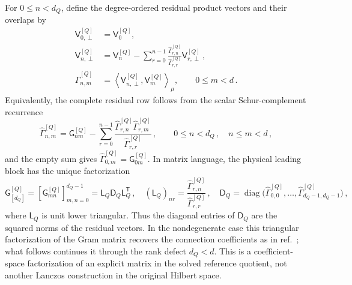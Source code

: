 \documentclass[a4paper,11pt]{article}
\theoremstyle{definition}
\theoremstyle{remark}
\newcommand{\diag}{\operatorname{diag}}
\begin{document}
For $0\le n<d_Q$, define the degree-ordered residual product vectors and
their overlaps by
\begin{equation}
\begin{aligned}
   \mathsf V_{0,\perp}^{[Q]}&=\mathsf V_0^{[Q]},\\
   \mathsf V_{n,\perp}^{[Q]}
   &=\mathsf V_n^{[Q]}
   -\sum_{r=0}^{n-1}
   \frac{\widehat\Gamma_{r,n}^{[Q]}}
        {\widehat\Gamma_{r,r}^{[Q]}}
   \mathsf V_{r,\perp}^{[Q]}\,,\\
   \widehat\Gamma_{n,m}^{[Q]}
   &=\left\langle
      \mathsf V_{n,\perp}^{[Q]},\mathsf V_m^{[Q]}
     \right\rangle_\mu,
   \qquad 0\le m<d\,.
\end{aligned}
   \label{eq:finite-product-residuals-app}
\end{equation}
Equivalently, the complete residual row follows from the scalar
Schur-complement recurrence
\begin{equation}
   \widehat\Gamma_{n,m}^{[Q]}
   =\mathsf G_{nm}^{[Q]}
   -\sum_{r=0}^{n-1}
   \frac{
      \widehat\Gamma_{r,n}^{[Q]}
      \widehat\Gamma_{r,m}^{[Q]}}
      {\widehat\Gamma_{r,r}^{[Q]}}\,,
   \qquad
   0\le n<d_Q\,,\quad n\le m<d\,,
   \label{eq:finite-product-Schur-app}
\end{equation}
and the empty sum gives
$\widehat\Gamma_{0,m}^{[Q]}=\mathsf G_{0m}^{[Q]}$.  In matrix
language, the physical leading block has the unique factorization
\begin{equation}
   \mathsf G_{[d_Q]}^{[Q]}
   =\left[\mathsf G_{mn}^{[Q]}\right]_{m,n=0}^{d_Q-1}
   =\mathsf L_Q\mathsf D_Q\mathsf L_Q^{\mathsf T}\,,
   \quad
   (\mathsf L_Q)_{nr}
   =\frac{\widehat\Gamma_{r,n}^{[Q]}}
          {\widehat\Gamma_{r,r}^{[Q]}}\,,
   \quad
   \mathsf D_Q
   =\diag\!\bigl(
      \widehat\Gamma_{0,0}^{[Q]},\ldots,
      \widehat\Gamma_{d_Q-1,d_Q-1}^{[Q]}
   \bigr)\,,
   \label{eq:finite-product-LDL-app}
\end{equation}
where $\mathsf L_Q$ is unit lower triangular.  Thus the diagonal entries
of $\mathsf D_Q$ are the squared norms of the residual vectors. In the nondegenerate case this triangular factorization of the Gram matrix recovers the connection coefficients as in ref.~\cite{GutlebOlverSlevinsky2024}; what follows continues it through the rank defect $d_Q<d$.  This is
a coefficient-space factorization of an explicit matrix in the solved
reference quotient, not another Lanczos construction in the original
Hilbert space.
\end{document}
